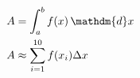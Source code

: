 \documentclass[preview]{standalone}
\begin{document}
\begin{align*}
A &= \int_{a}^{b} f(x) \, \mathdm{d} x \\ A &\approx \sum_{i=1}^{10}f(x_i)\Delta x
\end{align*}
\end{document}
